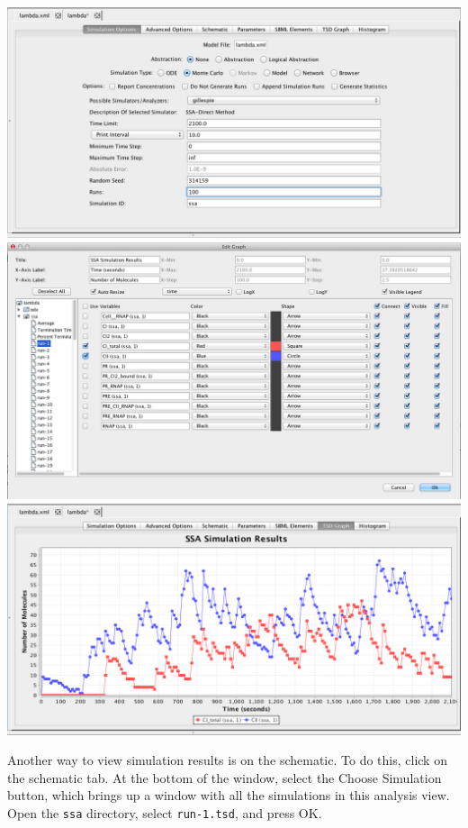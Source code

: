 \documentclass[titlepage,11pt]{article}
\begin{document}
\begin{center}
\includegraphics[width=160mm]{screenshots/ssaSim}\\
\includegraphics[width=160mm]{screenshots/ssaResults}\\
\includegraphics[width=160mm]{screenshots/ssaSimResults}
\end{center}

Another way to view simulation results is on the schematic.  To do this, click on the schematic tab.  At the bottom of the window, select the Choose Simulation button, which brings up a window with all the simulations in this analysis view.  Open the {\tt ssa} directory, select {\tt run-1.tsd}, and press OK. 
\end{document}
